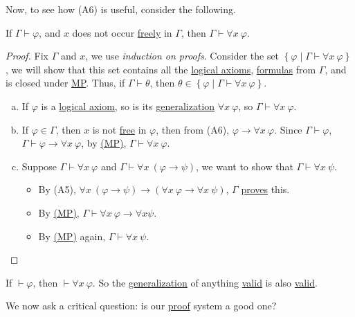 Now, to see how (A6) is useful, consider the following.

\begin{theorem}
	If \(\Gamma \vdash \varphi \), and \(x\) does not occur \hyperref[def:free-variable]{freely} in \(\Gamma \), then \(\Gamma \vdash \forall x\ \varphi \).
\end{theorem}
\begin{proof}
	Fix \(\Gamma \) and \(x\), we use \emph{induction on proofs}. Consider the set \(\left\{ \varphi \mid \Gamma \vdash \forall x\ \varphi \right\} \), we will show that this set contains all the \hyperref[def:logical-axioms]{logical axioms}, \hyperref[def:formula]{formulas} from \(\Gamma \), and is closed under \hyperref[def:rule-of-inference]{MP}. Thus, if \(\Gamma \vdash \theta \), then \(\theta \in \left\{ \varphi \mid \Gamma \vdash \forall x\ \varphi \right\} \).

	\begin{enumerate}[(a)]
		\item If \(\varphi \) is a \hyperref[def:logical-axioms]{logical axiom}, so is its \hyperref[def:generalization]{generalization} \(\forall x\ \varphi \), so \(\Gamma \vdash \forall x\ \varphi \).
		\item If \(\varphi \in \Gamma \), then \(x\) is not \hyperref[def:free-variable]{free} in \(\varphi \), then from (A6), \(\varphi \to \forall x\ \varphi \). Since \(\Gamma \vdash \varphi \), \(\Gamma \vdash \varphi \to \forall x\ \varphi \), by \hyperref[def:rule-of-inference]{(MP)}, \(\Gamma \vdash \forall x\ \varphi \).
		\item Suppose \(\Gamma \vdash \forall x\ \varphi \) and \(\Gamma \vdash \forall x\ (\varphi \to \psi )\), we want to show that \(\Gamma \vdash \forall x\ \psi \).
		      \begin{itemize}
			      \item By (A5), \(\forall x\ (\varphi \to \psi ) \to  (\forall x\ \varphi \to \forall x\ \psi )\), \(\Gamma \) \hyperref[def:proof]{proves} this.
			      \item By \hyperref[def:rule-of-inference]{(MP)}, \(\Gamma \vdash \forall x\ \varphi \to \forall x \psi \).
			      \item By \hyperref[def:rule-of-inference]{(MP)} again, \(\Gamma \vdash \forall x\ \psi \).
		      \end{itemize}
	\end{enumerate}
\end{proof}

\begin{corollary}
	If \(\vdash \varphi \), then \(\vdash \forall x\ \varphi \). So the \hyperref[def:generalization]{generalization} of anything \hyperref[def:valid]{valid} is also \hyperref[def:valid]{valid}.
\end{corollary}
We now ask a critical question: is our \hyperref[def:proof]{proof} system a good one?

